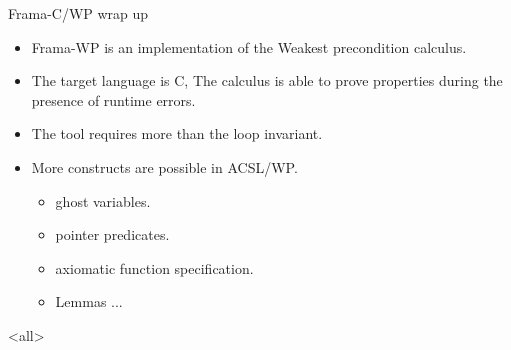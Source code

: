 \begin{frame}{Frama-C/WP wrap up}
\begin{itemize}
	\item Frama-WP is an implementation of the Weakest precondition calculus.
	\item The target language is C, The calculus is able to prove properties during the presence of runtime errors.
	\item The tool requires more than the loop invariant.
	\item More constructs are possible in ACSL/WP.
	\begin{itemize}
		\item ghost variables.
		\item pointer predicates.
		\item axiomatic function specification.
		\item Lemmas ...
	\end{itemize}
\end{itemize}
\end{frame}
\exercises

\mode
<all>